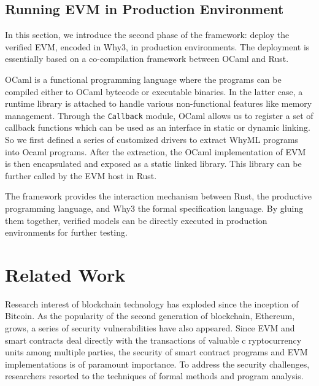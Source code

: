 \documentclass[runningheads]{llncs}
\begin{document}
\subsection{Running EVM in Production Environment}
In this section, we introduce the second phase of the framework: deploy the verified EVM, encoded in Why3, in production environments. The deployment is essentially based on a co-compilation framework between OCaml and Rust.

OCaml is a functional programming language where the programs can be compiled either to OCaml bytecode or executable binaries. In the latter case, a runtime library is attached to handle various non-functional features like memory management. Through the \texttt{Callback} module, OCaml allows us to register a set of callback functions which can be used as an interface in static or dynamic linking. 
So we first defined a series of customized drivers to extract WhyML programs into Ocaml programs. After the extraction, the OCaml implementation of EVM is then encapsulated and exposed as a static linked library. This library can be further called by the EVM host in Rust.

The framework provides the interaction mechanism between Rust, the productive programming language, and Why3 the formal specification language. By gluing them together, verified models can be directly executed in production environments for further testing.


\section{Related Work}\label{Sec: Related}
Research interest of blockchain technology has exploded since the inception  of Bitcoin. As the popularity of the second generation of blockchain, Ethereum, grows, a series of security vulnerabilities have also appeared. Since EVM and smart contracts deal directly with the transactions of valuable c
ryptocurrency units among multiple parties, the security of smart contract programs and EVM implementations is of paramount importance. To address the security challenges, researchers resorted to the techniques of formal methods and program analysis. 
\end{document}

